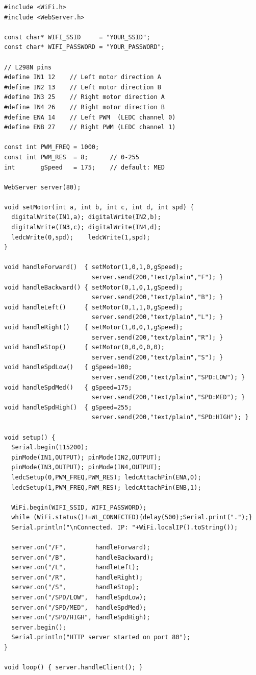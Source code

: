 \documentclass[12pt]{report}
\begin{document}
\begin{lstlisting}[style=cpp,
caption={ESP32 firmware --- Wi-Fi HTTP server with motion and speed control.}]
#include <WiFi.h>
#include <WebServer.h>

const char* WIFI_SSID     = "YOUR_SSID";
const char* WIFI_PASSWORD = "YOUR_PASSWORD";

// L298N pins
#define IN1 12    // Left motor direction A
#define IN2 13    // Left motor direction B
#define IN3 25    // Right motor direction A
#define IN4 26    // Right motor direction B
#define ENA 14    // Left PWM  (LEDC channel 0)
#define ENB 27    // Right PWM (LEDC channel 1)

const int PWM_FREQ = 1000;
const int PWM_RES  = 8;      // 0-255
int       gSpeed   = 175;    // default: MED

WebServer server(80);

void setMotor(int a, int b, int c, int d, int spd) {
  digitalWrite(IN1,a); digitalWrite(IN2,b);
  digitalWrite(IN3,c); digitalWrite(IN4,d);
  ledcWrite(0,spd);    ledcWrite(1,spd);
}

void handleForward()  { setMotor(1,0,1,0,gSpeed);
                        server.send(200,"text/plain","F"); }
void handleBackward() { setMotor(0,1,0,1,gSpeed);
                        server.send(200,"text/plain","B"); }
void handleLeft()     { setMotor(0,1,1,0,gSpeed);
                        server.send(200,"text/plain","L"); }
void handleRight()    { setMotor(1,0,0,1,gSpeed);
                        server.send(200,"text/plain","R"); }
void handleStop()     { setMotor(0,0,0,0,0);
                        server.send(200,"text/plain","S"); }
void handleSpdLow()   { gSpeed=100;
                        server.send(200,"text/plain","SPD:LOW"); }
void handleSpdMed()   { gSpeed=175;
                        server.send(200,"text/plain","SPD:MED"); }
void handleSpdHigh()  { gSpeed=255;
                        server.send(200,"text/plain","SPD:HIGH"); }

void setup() {
  Serial.begin(115200);
  pinMode(IN1,OUTPUT); pinMode(IN2,OUTPUT);
  pinMode(IN3,OUTPUT); pinMode(IN4,OUTPUT);
  ledcSetup(0,PWM_FREQ,PWM_RES); ledcAttachPin(ENA,0);
  ledcSetup(1,PWM_FREQ,PWM_RES); ledcAttachPin(ENB,1);

  WiFi.begin(WIFI_SSID, WIFI_PASSWORD);
  while (WiFi.status()!=WL_CONNECTED){delay(500);Serial.print(".");}
  Serial.println("\nConnected. IP: "+WiFi.localIP().toString());

  server.on("/F",        handleForward);
  server.on("/B",        handleBackward);
  server.on("/L",        handleLeft);
  server.on("/R",        handleRight);
  server.on("/S",        handleStop);
  server.on("/SPD/LOW",  handleSpdLow);
  server.on("/SPD/MED",  handleSpdMed);
  server.on("/SPD/HIGH", handleSpdHigh);
  server.begin();
  Serial.println("HTTP server started on port 80");
}

void loop() { server.handleClient(); }
\end{lstlisting}
\end{document}

